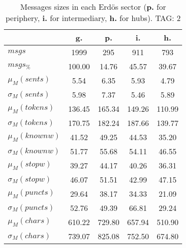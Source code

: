 \begin{table}[h!]
\begin{center}
\begin{tabular}{| l || c | c | c | c |}\hline
 & {\bf g.} & {\bf p.} & {\bf i.} & {\bf h.} \\\hline\hline
$msgs$ & 1999  & 295  & 911  & 793 \\
$msgs_{\%}$ & 100.00  & 14.76  & 45.57  & 39.67 \\\hline
$\mu_M(sents)$ & 5.54  & 6.35  & 5.93  & 4.79 \\
$\sigma_M(sents)$ & 5.98  & 7.37  & 5.46  & 5.89 \\\hline
$\mu_M(tokens)$ & 136.45  & 165.34  & 149.26  & 110.99 \\
$\sigma_M(tokens)$ & 170.75  & 182.24  & 187.66  & 139.77 \\\hline
$\mu_M(knownw)$ & 41.52  & 49.25  & 44.53  & 35.20 \\
$\sigma_M(knownw)$ & 51.77  & 55.68  & 54.11  & 46.55 \\\hline
$\mu_M(stopw)$ & 39.27  & 44.17  & 40.26  & 36.31 \\
$\sigma_M(stopw)$ & 46.07  & 51.51  & 42.99  & 47.15 \\\hline
$\mu_M(puncts)$ & 29.64  & 38.17  & 34.33  & 21.09 \\
$\sigma_M(puncts)$ & 52.76  & 49.39  & 66.81  & 29.24 \\\hline
$\mu_M(chars)$ & 610.22  & 729.80  & 657.94  & 510.90 \\
$\sigma_M(chars)$ & 739.07  & 825.08  & 752.50  & 674.80 \\\hline
\end{tabular}
\caption{Messages sizes in each Erd\"os sector ({{\bf p.}} for periphery, {{\bf i.}} for intermediary, {{\bf h.}} for hubs). TAG: 2}
\end{center}
\end{table}